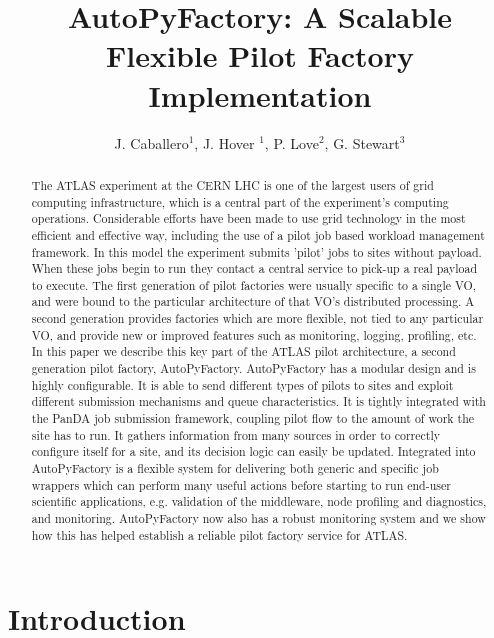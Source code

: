 \documentclass[a4paper]{jpconf}
\begin{document}
\title{AutoPyFactory: A Scalable Flexible Pilot Factory Implementation}

\author{J. Caballero$^1$, J. Hover $^1$, P. Love$^2$, G. Stewart$^3$}

\address{$^1$ Brookhaven National Laboratory, PO BOX 5000 Upton, NY 11973, USA}
\address{$^2$ Department of Physics, Lancaster University, Lancaster, LA1 4YB, UK }
\address{$^3$ Department of Physics and Astronomy, University of Glasgow, Glasgow G12 8QQ, UK}


\begin{abstract}
The ATLAS experiment at the CERN LHC is one of the largest users of grid computing
infrastructure, which is a central part of the experiment's computing operations.
Considerable efforts have been made to use grid technology in the most efficient
and effective way, including the use of a pilot job based workload management framework.
In this model the experiment submits 'pilot' jobs to sites without payload. When these
jobs begin to run they contact a central service to pick-up a real payload to execute.
The first generation of pilot factories were usually specific to a single VO, and were
bound to the particular architecture of that VO's distributed processing. A second
generation provides factories which are more flexible, not tied to any particular VO,
and provide new or improved features such as monitoring, logging, profiling, etc.
In this paper we describe this key part of the ATLAS pilot architecture, a second
generation pilot factory, AutoPyFactory.
AutoPyFactory has a modular design and is highly configurable. It is able to send
different types of pilots to sites and exploit different submission mechanisms and queue
characteristics. It is tightly integrated with the PanDA job submission framework,
coupling pilot flow to the amount of work the site has to run. It gathers information
from many sources in order to correctly configure itself for a site, and its decision logic
can easily be updated.
Integrated into AutoPyFactory is a flexible system for delivering both generic and
specific job wrappers which can perform many useful actions before starting to run
end-user scientific applications, e.g. validation of the middleware, node profiling
and diagnostics, and monitoring.
AutoPyFactory now also has a robust monitoring system and we show how this has helped
establish a reliable pilot factory service for ATLAS.
\end{abstract}


\section{Introduction}
\end{document}
